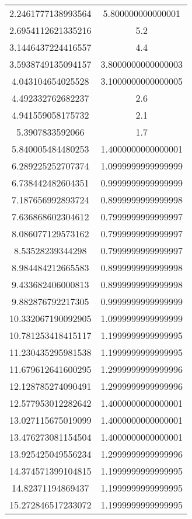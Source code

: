 \begin{table}
\begin{tabular}{S[]S[]}
2.2461777138993564 & 5.800000000000001\\
2.6954112621335216 & 5.2\\
3.1446437224416557 & 4.4\\
3.5938749135094157 & 3.8000000000000003\\
4.043104654025528 & 3.1000000000000005\\
4.492332762682237 & 2.6\\
4.941559058175732 & 2.1\\
5.3907833592066 & 1.7\\
5.840005484480253 & 1.4000000000000001\\
6.289225252707374 & 1.0999999999999999\\
6.738442482604351 & 0.9999999999999999\\
7.187656992893724 & 0.8999999999999998\\
7.636868602304612 & 0.7999999999999997\\
8.086077129573162 & 0.7999999999999997\\
8.53528239344298 & 0.7999999999999997\\
8.984484212665583 & 0.8999999999999998\\
9.433682406000813 & 0.8999999999999998\\
9.882876792217305 & 0.9999999999999999\\
10.332067190092905 & 1.0999999999999999\\
10.781253418415117 & 1.1999999999999995\\
11.230435295981538 & 1.1999999999999995\\
11.679612641600295 & 1.2999999999999996\\
12.128785274090491 & 1.2999999999999996\\
12.577953012282642 & 1.4000000000000001\\
13.027115675019099 & 1.4000000000000001\\
13.476273081154504 & 1.4000000000000001\\
13.925425049556234 & 1.2999999999999996\\
14.374571399104815 & 1.1999999999999995\\
14.82371194869437 & 1.1999999999999995\\
15.272846517233072 & 1.1999999999999995\\
\bottomrule
\end{tabular}\end{table}